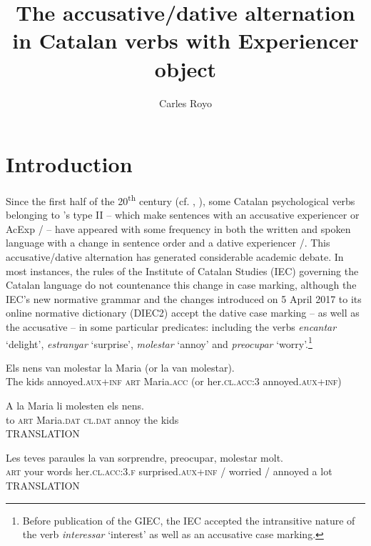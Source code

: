 \documentclass[output=paper,modfonts,nonflat,newtxmath]{langsci/langscibook}
\author{Carles Royo\affiliation{Universitat Rovira i Virgili}}
\title{The accusative/dative alternation in Catalan verbs with Experiencer object}
\begin{document}
\maketitle 

\section{Introduction}%
Since the first half of the 20\textsuperscript{th} century (cf. \citealt[16]{Ginebra2003}, \citealt[147]{Ginebra2015}), some Catalan psychological verbs belonging to \citet{BellettiRizzi1988}'s type II – which make sentences with an accusative experiencer or AcExp / – have appeared with some frequency in both the written and spoken language with a change in sentence order and a dative experiencer /. This accusative/dative alternation has generated considerable academic debate. In most instances, the rules of the Institute of Catalan Studies (IEC) governing the Catalan language do not countenance this change in case marking, although the IEC’s new normative grammar \citep{GIEC2016} and the changes introduced on 5 April 2017 to its online normative dictionary (DIEC2) accept the dative case marking – as well as the accusative – in some particular predicates: including the verbs \textit{encantar} ‘delight’, \textit{estranyar} ‘surprise’, \textit{molestar} ‘annoy’ and \textit{preocupar} ‘worry’.\footnote{Before publication of the GIEC, the IEC accepted the intransitive nature of the verb \textit{interessar} ‘interest’ as well as an accusative case marking.}

\ea%
 \label{ex:royo:1}
 \ea \label{ex:royo:1a}
 \gll Els nens van molestar la Maria ({or} la van molestar).\\
 The kids annoyed.\textsc{aux+inf} \textsc{art} Maria.\textsc{acc} ({or} her.\textsc{cl.acc}:3 annoyed.\textsc{aux+inf}) \\
 \glt 
 
 \ex \label{ex:royo:1b}
 \gll A la Maria li molesten els nens.\\
 to \textsc{art} Maria.\textsc{dat} \textsc{cl.dat} annoy the kids\\
 \glt TRANSLATION
 
 \z
 \z
 
\ea%
 \label{ex:royo:2} \citealt[77]{CabreMateu1998}
 \ea \label{ex:royo:2a}
 \gll Les teves paraules la van {sorprendre}, {preocupar}, {molestar} molt.\\
 \textsc{art} your words her.\textsc{cl.acc:3.f} surprised.\textsc{aux+inf} / worried / annoyed a lot\\
 \glt TRANSLATION
 
\end{document}
